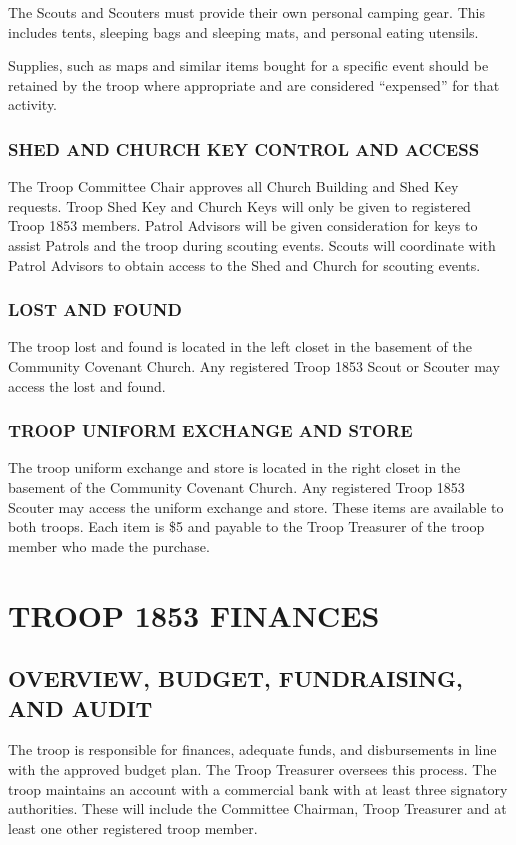 \documentclass{ltxguide}
\begin{document}
The Scouts and Scouters must provide their own personal camping gear. This includes tents, sleeping bags and sleeping mats, and personal eating utensils.

Supplies, such as maps and similar items bought for a specific event should be retained by the troop where appropriate and are considered “expensed” for that activity.

\subsubsection{SHED AND CHURCH KEY CONTROL AND ACCESS}
The Troop Committee Chair approves all Church Building and Shed Key requests. Troop Shed Key and Church Keys will only be given to registered Troop 1853 members. Patrol Advisors will be given consideration for keys to assist Patrols and the troop during scouting events. Scouts will coordinate with Patrol Advisors to obtain access to the Shed and Church for scouting events.

\subsubsection{LOST AND FOUND}
The troop lost and found is located in the left closet in the basement of the Community Covenant Church. Any registered Troop 1853 Scout or Scouter may access the lost and found.

\subsubsection{TROOP UNIFORM EXCHANGE AND STORE}
The troop uniform exchange and store is located in the right closet in the basement of the Community Covenant Church. Any registered Troop 1853 Scouter may access the uniform exchange and store. These items are available to both troops. Each item is \$5 and payable to the Troop Treasurer of the troop member who made the purchase.

\section{TROOP 1853 FINANCES}
\subsection{OVERVIEW, BUDGET, FUNDRAISING, AND AUDIT}
The troop is responsible for finances, adequate funds, and disbursements in line with the approved budget plan. The Troop Treasurer oversees this process. The troop maintains an account with a commercial bank with at least three signatory authorities. These will include the Committee Chairman, Troop Treasurer and at least one other registered troop member.
\end{document}
